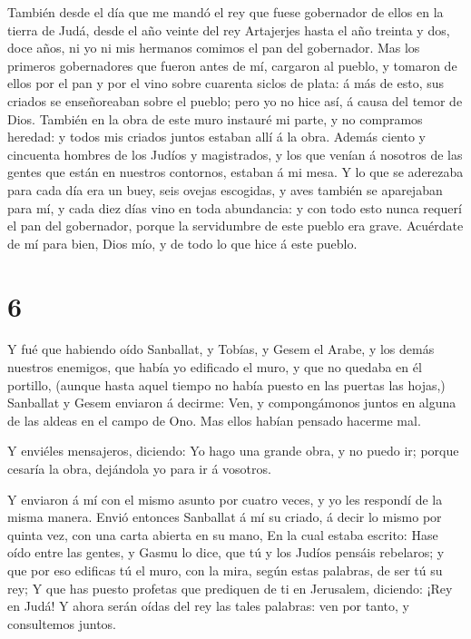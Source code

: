  También desde el día que me mandó el rey que fuese
gobernador de ellos en la tierra de Judá, desde el año veinte del rey
Artajerjes hasta el año treinta y dos, doce años, ni yo ni mis hermanos
comimos el pan del gobernador.  Mas los primeros
gobernadores que fueron antes de mí, cargaron al pueblo, y tomaron de
ellos por el pan y por el vino sobre cuarenta siclos de plata: á más de
esto, sus criados se enseñoreaban sobre el pueblo; pero yo no hice así,
á causa del temor de Dios.  También en la obra de este muro
instauré mi parte, y no compramos heredad: y todos mis criados juntos
estaban allí á la obra.  Además ciento y cincuenta hombres
de los Judíos y magistrados, y los que venían á nosotros de las gentes
que están en nuestros contornos, estaban á mi mesa.  Y lo
que se aderezaba para cada día era un buey, seis ovejas escogidas, y
aves también se aparejaban para mí, y cada diez días vino en toda
abundancia: y con todo esto nunca requerí el pan del gobernador, porque
la servidumbre de este pueblo era grave.  Acuérdate de mí
para bien, Dios mío, y de todo lo que hice á este pueblo.

\hypertarget{section-5}{%
\section{6}\label{section-5}}

 Y fué que habiendo oído Sanballat, y Tobías, y Gesem el
Arabe, y los demás nuestros enemigos, que había yo edificado el muro, y
que no quedaba en él portillo, (aunque hasta aquel tiempo no había
puesto en las puertas las hojas,)  Sanballat y Gesem
enviaron á decirme: Ven, y compongámonos juntos en alguna de las aldeas
en el campo de Ono. Mas ellos habían pensado hacerme mal.

 Y enviéles mensajeros, diciendo: Yo hago una grande obra, y
no puedo ir; porque cesaría la obra, dejándola yo para ir á vosotros.

 Y enviaron á mí con el mismo asunto por cuatro veces, y yo
les respondí de la misma manera.  Envió entonces Sanballat á
mí su criado, á decir lo mismo por quinta vez, con una carta abierta en
su mano,  En la cual estaba escrito: Hase oído entre las
gentes, y Gasmu lo dice, que tú y los Judíos pensáis rebelaros; y que
por eso edificas tú el muro, con la mira, según estas palabras, de ser
tú su rey;  Y que has puesto profetas que prediquen de ti en
Jerusalem, diciendo: ¡Rey en Judá! Y ahora serán oídas del rey las tales
palabras: ven por tanto, y consultemos juntos.

